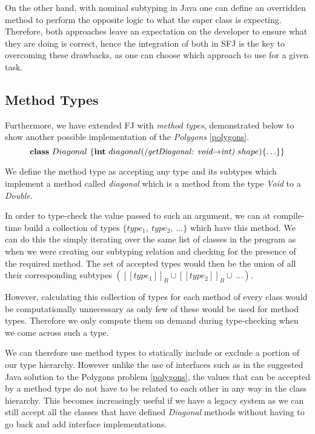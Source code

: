 \documentclass[runningheads]{llncs}
\begin{document}
On the other hand, with nominal subtyping in Java one can define an overridden method to perform the opposite logic to what the super class is expecting.
Therefore, both approaches leave an expectation on the developer to ensure what they are doing is correct, hence the integration of both in SFJ is the key to overcoming these drawbacks, as one can choose which approach to use for a given task.

\subsection{Method Types}

Furthermore, we have extended FJ with \emph{method types}, demonstrated below to show another possible implementation of the \emph{Polygons} \autoref{polygons}.
$$
    \mathbf{class} \  Diagonal \ \{
    \mathbf{int}\ diagonal(\textit{(getDiagonal: void$\rightarrow$int)}  \ shape)\{\ldots\}
    \}
$$

We define the method type as accepting any type and its subtypes which implement a method called \emph{diagonal} which is a method from the type \emph{Void} to a \emph{Double}.

In order to type-check the value passed to such an argument, we can at compile-time build a collection of types $\{type_{1},\ type_{2},\ \ldots\}$ which have this method.
We can do this the simply iterating over the same list of classes in the program as when we were creating our subtyping relation and checking for the presence of the required method.
The set of accepted types would then be the union of all their corresponding subtypes $([\![type_{1}]\!]_{B} \cup [\![type_{2}]\!]_{B} \cup\ \ldots)$.

However, calculating this collection of types for each method of every class would be computationally unnecessary as only few of these would be used for method types.
Therefore we only compute them on demand during type-checking when we come across such a type.

We can therefore use method types to statically include or exclude a portion of our type hierarchy.
However unlike the use of interfaces such as in the suggested Java solution to the Polygons problem \autoref{polygons}, the values that can be accepted by a method type do not have to be related to each other in any way in the class hierarchy.
This becomes increasingly useful if we have a legacy system as we can still accept all the classes that have defined \emph{Diagonal} methods without having to go back and add interface implementations.
\end{document}
